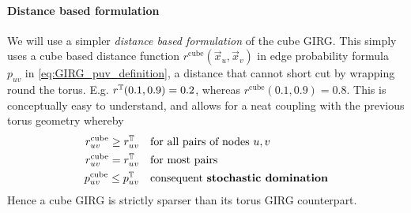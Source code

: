 \paragraph{Distance based formulation} We will use a simpler \textit{distance based formulation} of the cube GIRG. This simply uses a cube based distance function $r^\text{cube}(\vec{x}_u, \vec{x}_v)$ in edge probability formula $p_{uv}$ in \cref{eq:GIRG_puv_definition}, a distance that cannot short cut by wrapping round the torus. E.g. $r^{\mathbb{T}}(0.1, 0.9) = 0.2$, whereas $r^\text{cube}(0.1, 0.9) = 0.8$.
This is conceptually easy to understand, and allows for a neat coupling with the previous torus geometry whereby
\begin{align}
r_{uv}^\text{cube} \geq r_{uv}^{\mathbb{T}}
\quad & \text{for all pairs of nodes $u, v$}
\\
r_{uv}^\text{cube} = r_{uv}^{\mathbb{T}}
\quad & \text{for most pairs}
\\
p_{uv}^\text{cube} \leq p_{uv}^{\mathbb{T}}
\quad & \text{consequent \textbf{stochastic domination}}
\end{align}
Hence a cube GIRG is strictly sparser than its torus GIRG counterpart.


